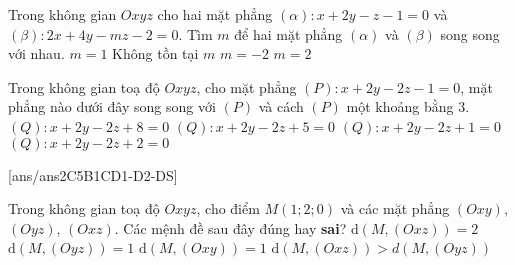 \begin{ex}%
	Trong không gian $Oxyz$ cho hai mặt phẳng $(\alpha)\colon x+2y-z-1=0$ và $(\beta)\colon 2x+4y-mz-2=0$. Tìm $m$ để hai mặt phẳng $(\alpha)$ và $(\beta)$ song song với nhau.
\choice
{$m=1$}
{\True Không tồn tại $m$}
{$m=-2$}
{$m=2$}
\end{ex}

\begin{ex}%
	Trong không gian toạ độ $Oxyz$, cho mặt phẳng $(P)\colon x+2y-2z-1=0$, mặt phẳng nào dưới đây song song với $(P)$ và cách $(P)$ một khoảng bằng $3$.
\choice
{\True $(Q)\colon x+2y-2z+8=0$}
{$(Q)\colon x+2y-2z+5=0$}
{$(Q)\colon x+2y-2z+1=0$}
{$(Q)\colon x+2y-2z+2=0$}
\end{ex}
\TNTF
{}[ans/ans2C5B1CD1-D2-DS]
\begin{ex}%
	Trong không gian toạ độ $Oxyz$, cho điểm $M\left(1;2;0\right)$ và các mặt phẳng $(Oxy)$, $(Oyz)$, $(Oxz)$. Các mệnh đề sau đây đúng hay \textbf{sai}?
\choiceTF
{\True $\mathrm{d}\left(M,(Oxz)\right)=2$}
{\True $\mathrm{d}\left(M,(Oyz)\right)=1$}
{$\mathrm{d}\left(M,(Oxy)\right)=1$}
{\True $\mathrm{d}\left(M,(Oxz)\right)>d\left(M,(Oyz)\right)$}
\end{ex}
